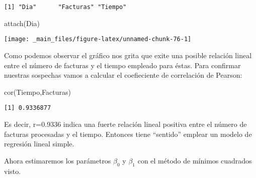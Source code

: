 \documentclass[
  a4paper,
  oneside,
  openany]{book}
\newenvironment{Shaded}{\begin{snugshade}}{\end{snugshade}}
\newcommand{\AttributeTok}[1]{\textcolor[rgb]{0.77,0.63,0.00}{#1}}
\newcommand{\DecValTok}[1]{\textcolor[rgb]{0.00,0.00,0.81}{#1}}
\newcommand{\FunctionTok}[1]{\textcolor[rgb]{0.00,0.00,0.00}{#1}}
\newcommand{\NormalTok}[1]{#1}
\newcommand{\SpecialCharTok}[1]{\textcolor[rgb]{0.00,0.00,0.00}{#1}}
\newcommand{\StringTok}[1]{\textcolor[rgb]{0.31,0.60,0.02}{#1}}
\begin{document}
\begin{verbatim}
[1] "Dia"      "Facturas" "Tiempo"  
\end{verbatim}

\begin{Shaded}
\begin{Highlighting}[]
\FunctionTok{attach}\NormalTok{(Dia)}
\end{Highlighting}
\end{Shaded}

\begin{Shaded}
\end{Shaded}

\begin{center}\texttt{[image: \_main\_files/figure-latex/unnamed-chunk-76-1]} \end{center}

Como podemos observar el gráfico nos grita que exite una posible relación lineal entre el número de facturas y el tiempo empleado para éstas.
Para confirmar nuestras sospechas vamos a calcular el coefieciente de correlación de Pearson:

\begin{Shaded}
\begin{Highlighting}[]
\FunctionTok{cor}\NormalTok{(Tiempo,Facturas)}
\end{Highlighting}
\end{Shaded}

\begin{verbatim}
[1] 0.9336877
\end{verbatim}

Es decir, r=0.9336 indica una fuerte relación lineal positiva entre el número de facturas procesadas y el tiempo. Entonces tiene ``sentido'' emplear un modelo de regresión lineal simple.

Ahora estimaremos los parámetros \(\beta_{0}\) y \(\beta_{1}\) con el método de mínimos cuadrados visto.
\end{document}
